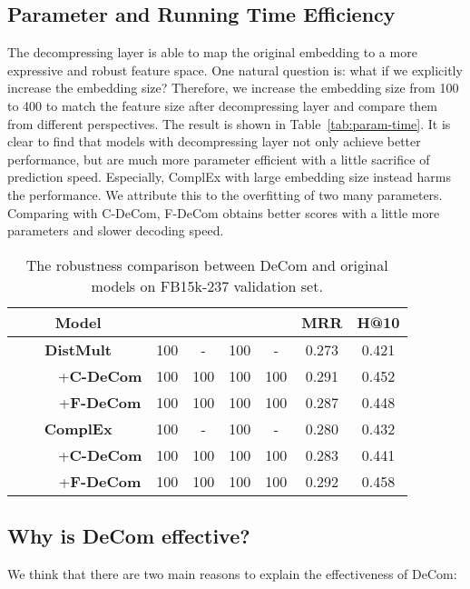 \documentclass[letterpaper]{article} \usepackage{aaai20}  \usepackage{times}  \usepackage{helvet} \usepackage{courier}  \usepackage{booktabs}
\begin{document}
\subsection{Parameter and Running Time Efficiency}
The decompressing layer is able to map the original embedding to a more expressive and robust feature space. One natural question is: what if we explicitly increase the embedding size? Therefore, we increase the embedding size from 100 to 400 to match the feature size after decompressing layer and compare them from different perspectives. The result is shown in Table~\ref{tab:param-time}. It is clear to find that models with decompressing layer not only achieve better performance, but are much more parameter efficient with a little sacrifice of  prediction speed. Especially, ComplEx with large embedding size instead harms the performance. We attribute this to the overfitting of two many parameters. Comparing with C-DeCom, F-DeCom obtains better scores with a little more parameters and slower decoding speed.












\begin{table}[!ht]
    \centering
    \begin{tabular}{|c|cccc|cc|}
    \toprule
        Model &  &  &  &  & MRR & H@10 \\
    \midrule
        \textbf{DistMult} & 100 & - & 100 & - & 0.273 & 0.421\\
        ~~~~~~+\textbf{C-DeCom} & 100 & 100 & 100 & 100 & 0.291 & 0.452\\
        ~~~~~~+\textbf{F-DeCom} & 100 & 100 & 100 & 100 & 0.287 & 0.448\\
    \midrule
        \textbf{ComplEx} & 100 & - & 100 & - & 0.280 & 0.432\\
        ~~~~~~+\textbf{C-DeCom} & 100 & 100 & 100 & 100& 0.283 & 0.441\\
        ~~~~~~+\textbf{F-DeCom} & 100 & 100 & 100 & 100& 0.292 & 0.458\\
    \bottomrule
    \end{tabular}
    \caption{The robustness comparison between DeCom and original models on FB15k-237 validation set. }
    \label{tab:decom_expressive}
\end{table}
\subsection{Why is DeCom effective?}
We think that there are two main reasons to explain the effectiveness of DeCom:
\end{document}
